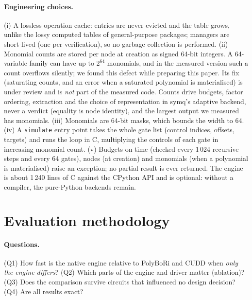 \documentclass[10pt,a4paper]{article}
\theoremstyle{definition}
\newcommand{\symq}{\textsf{symq}}
\begin{document}
\paragraph{Engineering choices.} (i) A lossless operation cache: entries are never evicted
and the table grows, unlike the lossy computed tables of general-purpose packages; managers are
short-lived (one per verification), so no garbage collection is performed. (ii) Monomial
counts are stored per node at creation as signed 64-bit integers. A 64-variable family can
have up to $2^{64}$ monomials, and in the measured version such a count overflows silently;
we found this defect while preparing this paper. Its fix (saturating counts, and an error
when a saturated polynomial is materialised) is under review and is \emph{not} part of the
measured code. Counts drive budgets, factor ordering, extraction and the choice of representation in
\symq{}'s adaptive backend, never a verdict (equality is node identity), and
the largest output we measured has \QMaxTerms{} monomials. (iii) Monomials are 64-bit masks, which bounds the width to 64.
(iv) A \texttt{simulate} entry point takes the whole gate list (control indices, offsets,
targets) and runs the loop in C, multiplying the controls of each gate in increasing
monomial count. (v) Budgets on time (checked every 1\,024 recursive steps and every 64
gates), nodes (at creation) and monomials (when a polynomial is materialised) raise an
exception; no partial result is ever returned. The engine is about 1\,240 lines of C against
the CPython API and is optional: without a compiler, the pure-Python backends remain.

\section{Evaluation methodology}\label{sec:method}

\paragraph{Questions.} (Q1) How fast is the native engine relative to PolyBoRi and CUDD when
\emph{only the engine differs}? (Q2) Which parts of the engine and driver matter (ablation)?
(Q3) Does the comparison survive circuits that influenced no design decision? (Q4) Are all
results exact?
\end{document}
